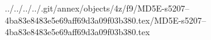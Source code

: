 ../../../../.git/annex/objects/4z/f9/MD5E-s5207--4ba83e8483e5e69aff69d3a09f03b380.tex/MD5E-s5207--4ba83e8483e5e69aff69d3a09f03b380.tex